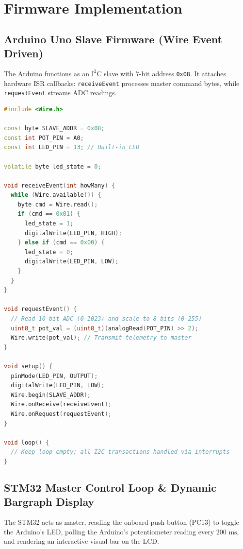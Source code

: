 \documentclass[11pt,a4paper]{article}
\begin{document}
\section{Firmware Implementation}

\subsection{Arduino Uno Slave Firmware (Wire Event Driven)}
The Arduino functions as an $\text{I}^2\text{C}$ slave with 7-bit address \texttt{0x08}. It attaches hardware ISR callbacks: \texttt{receiveEvent} processes master command bytes, while \texttt{requestEvent} streams ADC readings.

\begin{lstlisting}[language=C++, caption={Arduino Uno I2C Slave Implementation (Address 0x08)}]
#include <Wire.h>

const byte SLAVE_ADDR = 0x08;
const int POT_PIN = A0;
const int LED_PIN = 13; // Built-in LED

volatile byte led_state = 0;

void receiveEvent(int howMany) {
  while (Wire.available()) {
    byte cmd = Wire.read();
    if (cmd == 0x01) {
      led_state = 1;
      digitalWrite(LED_PIN, HIGH);
    } else if (cmd == 0x00) {
      led_state = 0;
      digitalWrite(LED_PIN, LOW);
    }
  }
}

void requestEvent() {
  // Read 10-bit ADC (0-1023) and scale to 8 bits (0-255)
  uint8_t pot_val = (uint8_t)(analogRead(POT_PIN) >> 2);
  Wire.write(pot_val); // Transmit telemetry to master
}

void setup() {
  pinMode(LED_PIN, OUTPUT);
  digitalWrite(LED_PIN, LOW);
  Wire.begin(SLAVE_ADDR);
  Wire.onReceive(receiveEvent);
  Wire.onRequest(requestEvent);
}

void loop() {
  // Keep loop empty; all I2C transactions handled via interrupts
}
\end{lstlisting}

\subsection{STM32 Master Control Loop \& Dynamic Bargraph Display}
The STM32 acts as master, reading the onboard push-button (PC13) to toggle the Arduino's LED, polling the Arduino's potentiometer reading every $200\text{ ms}$, and rendering an interactive visual bar on the LCD.
\end{document}
